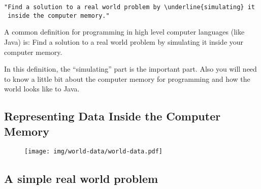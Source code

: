 \documentclass[8pt, a4paper, oneside]{extarticle}
\begin{document}
\begin{multicols}{2}
\begin{Verbatim}
"Find a solution to a real world problem by \underline{simulating} it
 inside the computer memory."
\end{Verbatim}
  \columnbreak

  A common definition for programming in high level computer languages (like
  Java) is: Find a solution to a real world problem by simulating it inside
  your computer memory.

  In this definition, the ``simulating'' part is the important part. Also you
  will need to know a little bit about the computer memory for programming and
  how the world looks like to Java.

\end{multicols}

\subsection{Representing Data Inside the Computer Memory}

\begin{figure}[!ht]
  \centering
  \texttt{[image: img/world-data/world-data.pdf]}
\end{figure}

\subsection{A simple real world problem}
\end{document}
